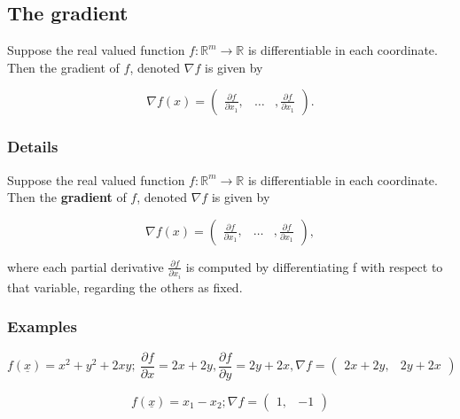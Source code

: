 \documentclass[12pt,a4paper]{article}
\theoremstyle{regla}
\theoremstyle{remark}
\theoremstyle{definition}
\theoremstyle{nonumberbreak}
\begin{document}
\subsection{The gradient}
\begin{fbox}
\begin{minipage}{0.97\textwidth}
Suppose the real valued function $f:
\mathbb{R}^m \rightarrow \mathbb{R}$ is differentiable in 
each coordinate. Then the gradient of $f$, denoted $\nabla f$ is given by 


$$\nabla f(x)=\begin{pmatrix}\frac{\partial f}{\partial x_1},&\dots &,\frac{\partial f}{\partial x_1}\end{pmatrix}.$$

\end{minipage}
\end{fbox}
\subsubsection{Details}
\begin{defn}
Suppose the real valued function $f:\mathbb{R}^m \rightarrow \mathbb{R}$ is differentiable in 
each coordinate. Then the {\bf gradient} of $f$, denoted $\nabla f$ is given by 

$$\nabla f(x)=\begin{pmatrix}\frac{\partial f}{\partial x_1},&\dots &,\frac{\partial f}{\partial x_1}\end{pmatrix},$$

where each partial derivative $\frac{\partial f}{\partial x_i}$ is computed by differentiating f with respect to that variable, regarding the others as fixed. 
\end{defn}
\subsubsection{Examples}
\begin{xmpl}

$$f(\underline{x})= x^2+y^2+2xy;\ \frac{\partial f}{\partial x}=2x+2y,  \frac{\partial f}{\partial y}=2y+2x, \nabla f =\begin{pmatrix}2x+2y, & 2y+2x\end{pmatrix}$$
\end{xmpl}
\begin{xmpl}


$$f(\underline{x})=x_1-x_2; \nabla f= \begin{pmatrix}1, & -1\end{pmatrix}$$
\end{xmpl}
\end{document}
